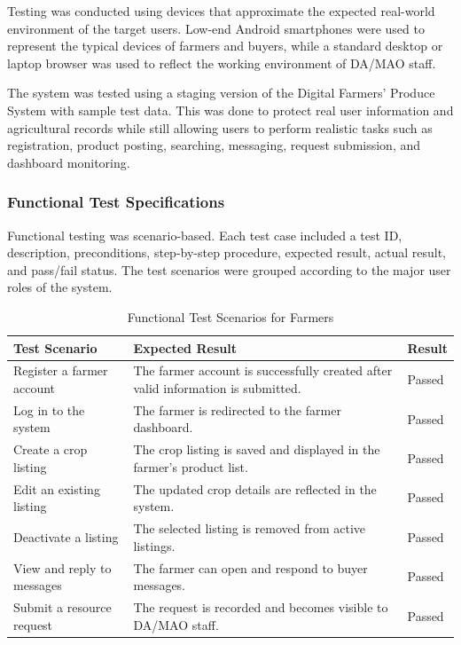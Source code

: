 Testing was conducted using devices that approximate the expected real-world environment of the target users. Low-end Android smartphones were used to represent the typical devices of farmers and buyers, while a standard desktop or laptop browser was used to reflect the working environment of DA/MAO staff.

The system was tested using a staging version of the Digital Farmers' Produce System with sample test data. This was done to protect real user information and agricultural records while still allowing users to perform realistic tasks such as registration, product posting, searching, messaging, request submission, and dashboard monitoring.

\subsubsection{Functional Test Specifications}

Functional testing was scenario-based. Each test case included a test ID, description, preconditions, step-by-step procedure, expected result, actual result, and pass/fail status. The test scenarios were grouped according to the major user roles of the system.

\begin{table}[H]
\centering
\caption{Functional Test Scenarios for Farmers}
\begin{tabular}{p{4cm}p{6cm}p{3cm}}
\hline
\textbf{Test Scenario} & \textbf{Expected Result} & \textbf{Result} \\
\hline
Register a farmer account & The farmer account is successfully created after valid information is submitted. & Passed \\
Log in to the system & The farmer is redirected to the farmer dashboard. & Passed \\
Create a crop listing & The crop listing is saved and displayed in the farmer's product list. & Passed \\
Edit an existing listing & The updated crop details are reflected in the system. & Passed \\
Deactivate a listing & The selected listing is removed from active listings. & Passed \\
View and reply to messages & The farmer can open and respond to buyer messages. & Passed \\
Submit a resource request & The request is recorded and becomes visible to DA/MAO staff. & Passed \\
\hline
\end{tabular}
\end{table}

